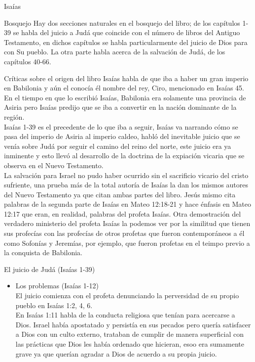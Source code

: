\begin{section}{Isaías}
	\begin{subsection}{Bosquejo}
		Hay dos secciones naturales en el bosquejo del libro; de los capítulos 1-39 se habla del juicio a Judá que coincide con el número de libros del Antiguo Testamento,  en dichos capítulos se habla particularmente del juicio de Dios para con Su pueblo. La otra parte habla acerca de la salvación de Judá, de los capítulos 40-66.\\
		\begin{subsubsection}{Críticas sobre el origen del libro}
Isaías habla de que iba a haber un gran imperio en Babilonia y aún el conocía él nombre del rey, Ciro, mencionado en Isaías 45. En el tiempo en que lo escribió Isaías, Babilonia era solamente una provincia de Asiria pero Isaías predijo que se iba a convertir en la nación dominante de la región.\\
Isaías 1-39 es el precedente de lo que iba a seguir, Isaías va narrando cómo se pasa del imperio de Asiria al imperio caldeo, habló del inevitable juicio que se venía sobre Judá por seguir el camino del reino del norte, este juicio era ya inminente y esto llevó al desarrollo de la doctrina de la expiación vicaria que se observa en el Nuevo Testamento.\\
La salvación para Israel no pudo haber ocurrido sin el sacrificio vicario del cristo sufriente, una prueba más de la total autoría de Isaías la dan los mismos autores del Nuevo Testamento ya que citan ambas partes del libro. Jesús mismo cita palabras de la segunda parte de Isaías en Mateo 12:18-21 y hace énfasis en Mateo 12:17 que eran, en realidad, palabras del profeta Isaías. 
\newpage
Otra demostración del verdadero ministerio del profeta Isaías la podemos ver por la similitud que tienen sus profecías con las profecías de otros profetas que fueron contemporáneos a él como Sofonías y Jeremías, por ejemplo, que fueron profetas en el teimpo previo a la conquista de Babilonia.\\
		\end{subsubsection}
		\begin{subsubsection}{El juicio de Judá (Isaías 1-39)}
			\begin{itemize}
				\item Los problemas (Isaías 1-12)\\
					El juicio comienza con el profeta denunciando la perversidad de su propio pueblo en Isaías 1:2, 4, 6.\\
En Isaías 1:11 habla de la conducta religiosa que tenían para acercarse a Dios. Israel había apostatado y persistía en sus pecados pero quería satisfacer a Dios con un culto externo, trataban de cumplir de manera superficial con las prácticas que Dios les había ordenado que hicieran, esoo era sumamente grave ya que querían agradar a Dios de acuerdo a su propia juicio. \\

\end{itemize}
\end{subsubsection}
\end{subsection}
\end{section}
